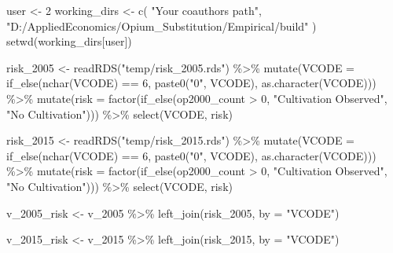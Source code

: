 \documentclass[
  letterpaper,
  DIV=11,
  numbers=noendperiod]{scrartcl}
\newenvironment{Shaded}{\begin{snugshade}}{\end{snugshade}}
\newcommand{\AttributeTok}[1]{\textcolor[rgb]{0.40,0.45,0.13}{#1}}
\newcommand{\DecValTok}[1]{\textcolor[rgb]{0.68,0.00,0.00}{#1}}
\newcommand{\FunctionTok}[1]{\textcolor[rgb]{0.28,0.35,0.67}{#1}}
\newcommand{\NormalTok}[1]{\textcolor[rgb]{0.00,0.23,0.31}{#1}}
\newcommand{\OtherTok}[1]{\textcolor[rgb]{0.00,0.23,0.31}{#1}}
\newcommand{\SpecialCharTok}[1]{\textcolor[rgb]{0.37,0.37,0.37}{#1}}
\newcommand{\StringTok}[1]{\textcolor[rgb]{0.13,0.47,0.30}{#1}}
\begin{document}
\begin{Shaded}
\begin{Highlighting}[]
\NormalTok{user }\OtherTok{\textless{}{-}} \DecValTok{2}
\NormalTok{working\_dirs }\OtherTok{\textless{}{-}} \FunctionTok{c}\NormalTok{(}
  \StringTok{"Your coauthor\textquotesingle{}s path"}\NormalTok{,           }
  \StringTok{"D:/AppliedEconomics/Opium\_Substitution/Empirical/build"}
\NormalTok{)}
\FunctionTok{setwd}\NormalTok{(working\_dirs[user])}

\NormalTok{risk\_2005 }\OtherTok{\textless{}{-}} \FunctionTok{readRDS}\NormalTok{(}\StringTok{"temp/risk\_2005.rds"}\NormalTok{) }\SpecialCharTok{\%\textgreater{}\%} 
  \FunctionTok{mutate}\NormalTok{(}\AttributeTok{VCODE =} \FunctionTok{if\_else}\NormalTok{(}\FunctionTok{nchar}\NormalTok{(VCODE) }\SpecialCharTok{==} \DecValTok{6}\NormalTok{, }\FunctionTok{paste0}\NormalTok{(}\StringTok{"0"}\NormalTok{, VCODE), }\FunctionTok{as.character}\NormalTok{(VCODE))) }\SpecialCharTok{\%\textgreater{}\%} 
  \FunctionTok{mutate}\NormalTok{(}\AttributeTok{risk =} \FunctionTok{factor}\NormalTok{(}\FunctionTok{if\_else}\NormalTok{(op2000\_count }\SpecialCharTok{\textgreater{}} \DecValTok{0}\NormalTok{, }\StringTok{"Cultivation Observed"}\NormalTok{, }\StringTok{"No Cultivation"}\NormalTok{))) }\SpecialCharTok{\%\textgreater{}\%} 
  \FunctionTok{select}\NormalTok{(VCODE, risk)}

\NormalTok{risk\_2015 }\OtherTok{\textless{}{-}} \FunctionTok{readRDS}\NormalTok{(}\StringTok{"temp/risk\_2015.rds"}\NormalTok{) }\SpecialCharTok{\%\textgreater{}\%} 
  \FunctionTok{mutate}\NormalTok{(}\AttributeTok{VCODE =} \FunctionTok{if\_else}\NormalTok{(}\FunctionTok{nchar}\NormalTok{(VCODE) }\SpecialCharTok{==} \DecValTok{6}\NormalTok{, }\FunctionTok{paste0}\NormalTok{(}\StringTok{"0"}\NormalTok{, VCODE), }\FunctionTok{as.character}\NormalTok{(VCODE))) }\SpecialCharTok{\%\textgreater{}\%} 
  \FunctionTok{mutate}\NormalTok{(}\AttributeTok{risk =} \FunctionTok{factor}\NormalTok{(}\FunctionTok{if\_else}\NormalTok{(op2000\_count }\SpecialCharTok{\textgreater{}} \DecValTok{0}\NormalTok{, }\StringTok{"Cultivation Observed"}\NormalTok{, }\StringTok{"No Cultivation"}\NormalTok{))) }\SpecialCharTok{\%\textgreater{}\%} 
  \FunctionTok{select}\NormalTok{(VCODE, risk)}

\NormalTok{v\_2005\_risk }\OtherTok{\textless{}{-}}\NormalTok{ v\_2005 }\SpecialCharTok{\%\textgreater{}\%} 
  \FunctionTok{left\_join}\NormalTok{(risk\_2005, }\AttributeTok{by =} \StringTok{"VCODE"}\NormalTok{)}

\NormalTok{v\_2015\_risk }\OtherTok{\textless{}{-}}\NormalTok{ v\_2015 }\SpecialCharTok{\%\textgreater{}\%} 
  \FunctionTok{left\_join}\NormalTok{(risk\_2015, }\AttributeTok{by =} \StringTok{"VCODE"}\NormalTok{)}
\end{Highlighting}
\end{Shaded}
\end{document}
